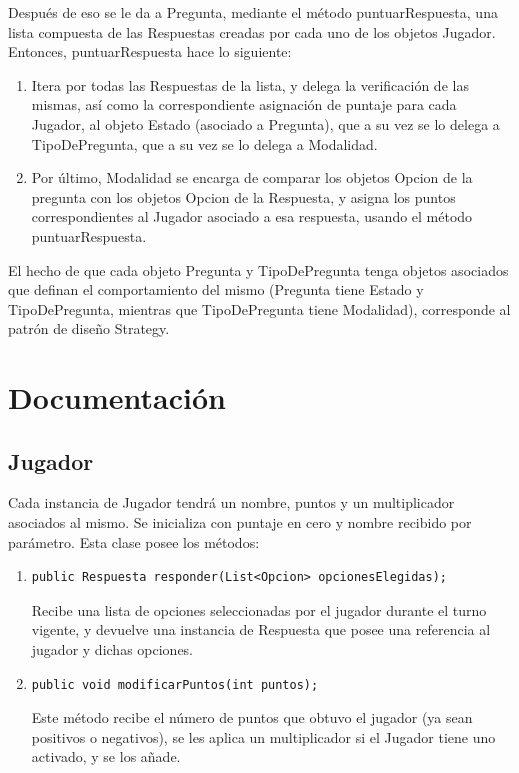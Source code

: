 \documentclass[titlepage,a4paper]{article}
\begin{document}
Después de eso se le da a Pregunta, mediante el método puntuarRespuesta, una lista compuesta de las Respuestas creadas por cada uno de los objetos Jugador. Entonces, puntuarRespuesta hace lo siguiente:
\begin{enumerate}
\item Itera por todas las Respuestas de la lista, y delega la verificación de las mismas, así como la correspondiente asignación de puntaje para cada Jugador, al objeto Estado (asociado a Pregunta), que a su vez se lo delega a TipoDePregunta, que a su vez se lo delega a Modalidad.
\item Por último, Modalidad se encarga de comparar los objetos Opcion de la pregunta con los objetos Opcion de la Respuesta, y asigna los puntos correspondientes al Jugador asociado a esa respuesta, usando el método puntuarRespuesta.
\end{enumerate}

El hecho de que cada objeto Pregunta y TipoDePregunta tenga objetos asociados que definan el comportamiento del mismo (Pregunta tiene Estado y TipoDePregunta, mientras que TipoDePregunta tiene Modalidad), corresponde al patrón de diseño Strategy.


\section{Documentación}

\subsection{Jugador}
Cada instancia de Jugador tendrá un nombre, puntos y un multiplicador asociados al mismo. Se inicializa con puntaje en cero y nombre recibido por parámetro. Esta clase posee los métodos:
\begin{enumerate}
\item \begin{verbatim}public Respuesta responder(List<Opcion> opcionesElegidas);\end{verbatim} Recibe una lista de opciones seleccionadas por el jugador durante el turno vigente, y devuelve una instancia de Respuesta que posee una referencia al jugador y dichas opciones.
\item \begin{verbatim}public void modificarPuntos(int puntos);\end{verbatim} Este método recibe el número de puntos que obtuvo el jugador (ya sean positivos o negativos), se les aplica un multiplicador si el Jugador tiene uno activado, y se los añade.
\end{enumerate}
\end{document}
